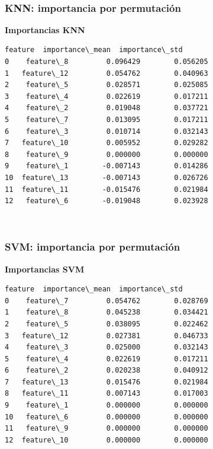 \documentclass[11pt]{article}
\begin{document}
    
    \begin{center}
    \end{center}
    { \hspace*{\fill} \\}
    
    \subsubsection{KNN: importancia por
permutación}\label{knn-importancia-por-permutaciuxf3n}

    
    \textbf{Importancias KNN}

    
    
    \begin{Verbatim}[commandchars=\\\{\}]
       feature  importance\_mean  importance\_std
0    feature\_8         0.096429        0.056205
1   feature\_12         0.054762        0.040963
2    feature\_5         0.028571        0.025085
3    feature\_4         0.022619        0.017211
4    feature\_2         0.019048        0.037721
5    feature\_7         0.013095        0.017211
6    feature\_3         0.010714        0.032143
7   feature\_10         0.005952        0.029282
8    feature\_9         0.000000        0.000000
9    feature\_1        -0.007143        0.014286
10  feature\_13        -0.007143        0.026726
11  feature\_11        -0.015476        0.021984
12   feature\_6        -0.019048        0.023928
    \end{Verbatim}

    
    \begin{center}
    \end{center}
    { \hspace*{\fill} \\}
    
    \subsubsection{SVM: importancia por
permutación}\label{svm-importancia-por-permutaciuxf3n}

    
    \textbf{Importancias SVM}

    
    
    \begin{Verbatim}[commandchars=\\\{\}]
       feature  importance\_mean  importance\_std
0    feature\_7         0.054762        0.028769
1    feature\_8         0.045238        0.034421
2    feature\_5         0.038095        0.022462
3   feature\_12         0.027381        0.046733
4    feature\_3         0.025000        0.032143
5    feature\_4         0.022619        0.017211
6    feature\_2         0.020238        0.040912
7   feature\_13         0.015476        0.021984
8   feature\_11         0.007143        0.017003
9    feature\_1         0.000000        0.000000
10   feature\_6         0.000000        0.000000
11   feature\_9         0.000000        0.000000
12  feature\_10         0.000000        0.000000
    \end{Verbatim}
\end{document}

